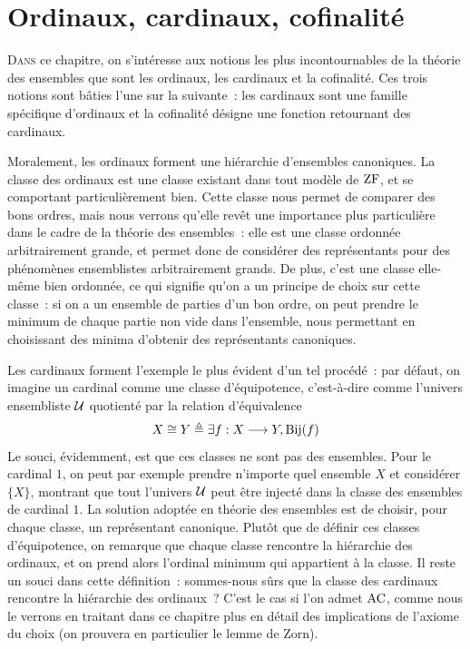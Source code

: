 \chapter{Ordinaux, cardinaux, cofinalité}
\label{chp.ordinaux}

\minitoc

\lettrine{D}{ans} ce chapitre, on s'intéresse aux notions les plus
incontournables de la théorie des ensembles que sont les ordinaux, les cardinaux
et la cofinalité. Ces trois notions sont bâties l'une sur la suivante~: les
cardinaux sont une famille spécifique d'ordinaux et la cofinalité désigne une
fonction retournant des cardinaux.

Moralement, les ordinaux forment une hiérarchie d'ensembles canoniques. La
classe des ordinaux est une classe existant dans tout modèle de $\operatorname{ZF}$, et se
comportant particulièrement bien. Cette classe nous permet de comparer des bons
ordres, mais nous verrons qu'elle revêt une importance plus particulière dans le
cadre de la théorie des ensembles~: elle est une classe ordonnée arbitrairement
grande, et permet donc de considérer des représentants pour des phénomènes
ensemblistes arbitrairement grands. De plus, c'est une classe elle-même bien
ordonnée, ce qui signifie qu'on a un principe de choix sur cette classe~: si on
a un ensemble de parties d'un bon ordre, on peut prendre le minimum de chaque
partie non vide dans l'ensemble, nous permettant en choisissant des minima
d'obtenir des représentants canoniques.

Les cardinaux forment l'exemple le plus évident d'un tel procédé~: par défaut,
on imagine un cardinal comme une classe d'équipotence, c'est-à-dire comme
l'univers ensembliste $\mathcal{U}$ quotienté par la relation d'équivalence
\[X\cong Y \triangleq \exists f : \displaystyle X \longrightarrow Y, \operatorname{Bij}(f)\]
Le souci, évidemment, est que ces classes ne sont pas des ensembles. Pour le
cardinal $1$, on peut par exemple prendre n'importe quel ensemble $X$ et
considérer $\{X\}$, montrant que tout l'univers $\mathcal{U}$ peut être injecté
dans la classe des ensembles de cardinal $1$. La solution adoptée en théorie des
ensembles est de choisir, pour chaque classe, un représentant canonique.
Plutôt que de définir ces classes d'équipotence, on remarque que chaque classe
rencontre la hiérarchie des ordinaux, et on prend alors l'ordinal minimum qui
appartient à la classe. Il reste un souci dans cette définition~: sommes-nous
sûrs que la classe des cardinaux rencontre la hiérarchie des ordinaux~? C'est le
cas si l'on admet $\operatorname{AC}$, comme nous le verrons en traitant dans ce
chapitre plus en détail des implications de l'axiome du choix (on prouvera
en particulier le lemme de Zorn).

